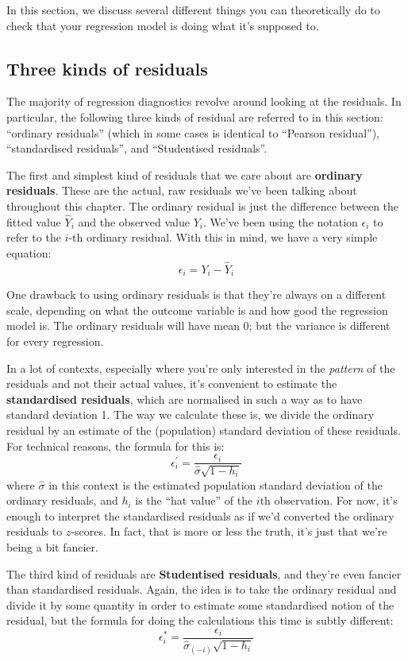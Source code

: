 \documentclass[
  11pt,
  a4paper,
  twoside,symmetric,openright]{book}
\theoremstyle{break}
\theoremstyle{break}
\begin{document}
In this section, we discuss several different things you can theoretically do to check that your regression model is doing what it's supposed to.

\subsection{Three kinds of residuals}\label{three-kinds-of-residuals}

The majority of regression diagnostics revolve around looking at the residuals. In particular, the following three kinds of residual are referred to in this section: ``ordinary residuals'' (which in some cases is identical to ``Pearson residual''), ``standardised residuals'', and ``Studentised residuals''.

The first and simplest kind of residuals that we care about are \textbf{ordinary residuals}. These are the actual, raw residuals we've been talking about throughout this chapter. The ordinary residual is just the difference between the fitted value \(\hat{Y}_i\) and the observed value \(Y_i\). We've been using the notation \(\epsilon_i\) to refer to the \(i\)-th ordinary residual. With this in mind, we have a very simple equation:
\[
\epsilon_i = Y_i - \hat{Y}_i
\]

One drawback to using ordinary residuals is that they're always on a different scale, depending on what the outcome variable is and how good the regression model is. The ordinary residuals will have mean 0; but the variance is different for every regression.

In a lot of contexts, especially where you're only interested in the \emph{pattern} of the residuals and not their actual values, it's convenient to estimate the \textbf{standardised residuals}, which are normalised in such a way as to have standard deviation 1. The way we calculate these is, we divide the ordinary residual by an estimate of the (population) standard deviation of these residuals. For technical reasons, the formula for this is:
\[
\epsilon_{i}^\prime = \frac{\epsilon_i}{\hat{\sigma} \sqrt{1-h_i}}
\]
where \(\hat\sigma\) in this context is the estimated population standard deviation of the ordinary residuals, and \(h_i\) is the ``hat value'' of the \(i\)th observation. For now, it's enough to interpret the standardised residuals as if we'd converted the ordinary residuals to \(z\)-scores. In fact, that is more or less the truth, it's just that we're being a bit fancier.

The third kind of residuals are \textbf{Studentised residuals}, and they're even fancier than standardised residuals. Again, the idea is to take the ordinary residual and divide it by some quantity in order to estimate some standardised notion of the residual, but the formula for doing the calculations this time is subtly different:
\[
\epsilon_{i}^* = \frac{\epsilon_i}{\hat{\sigma}_{(-i)} \sqrt{1-h_i}}
\]
\end{document}
